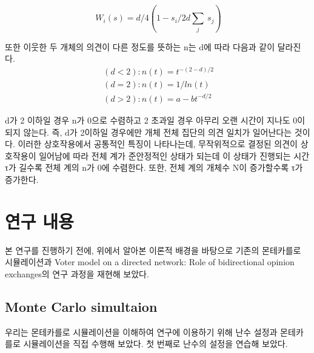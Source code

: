 \documentclass{gshs-report-v1.2}
\begin{document}
\begin{equation}
\ {W}_i(s)=d/4(1-s_i/2d\sum_j\ {s}_j)\nonumber
\end{equation}

또한 이웃한 두 개체의 의견이 다른 정도를 뜻하는 n는 d에 따라 다음과 같이 달라진다.
\begin{align}
\ (d<2):n(t)= t^{-(2-d)/2}	\\
\ (d=2):n(t)= 1/ln(t)	\\
\ (d>2):n(t)= a-bt^{-d/2}
\end{align}

d가 2 이하일 경우 n가 0으로 수렴하고 2 초과일 경우 아무리 오랜 시간이 지나도 0이 되지 않는다. 즉, d가 2이하일 경우에만 개체 전체 집단의 의견 일치가 일어난다는 것이다. 이러한 상호작용에서 공통적인 특징이 나타나는데, 무작위적으로 결정된 의견이 상호작용이 일어남에 따라 전체 계가 준안정적인 상태가 되는데 이 상태가 진행되는 시간 τ가 길수록 전체 계의 n가 0에 수렴한다. 또한, 전체 계의 개체수 N이 증가할수록 τ가 증가한다.\cite{Han10}

\section{연구 내용}

본 연구를 진행하기 전에, 위에서 알아본 이론적 배경을 바탕으로 기존의 몬테카를로 시뮬레이션과 Voter model on a directed network: Role of bidirectional opinion exchanges\cite{Han10}의 연구 과정을 재현해 보았다.

\subsection{Monte Carlo simultaion}

우리는 몬테카를로 시뮬레이션을 이해하여 연구에 이용하기 위해 난수 설정과 몬테카를로 시뮬레이션을 직접 수행해 보았다.
첫 번째로 난수의 설정을 연습해 보았다.
\end{document}
